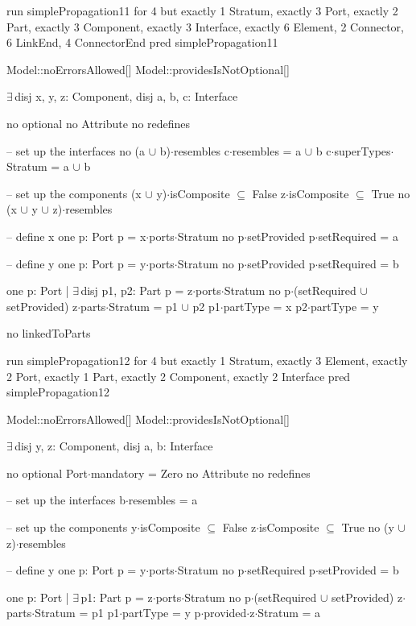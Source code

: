 run simplePropagation11 for 4 but exactly 1 Stratum, exactly 3 Port, exactly 2 Part, exactly 3 Component, exactly 3 Interface, exactly 6 Element, 2 Connector, 6 LinkEnd, 4 ConnectorEnd
pred simplePropagation11
{
  Model::noErrorsAllowed[]
  Model::providesIsNotOptional[]

  $\exists\,$disj x, y, z: Component,
       disj a, b, c: Interface
  {
    no optional
    no Attribute
    no redefines
  
    -- set up the interfaces
    no (a $\cup$ b)$\cdot$resembles
    c$\cdot$resembles = a $\cup$ b
    c$\cdot$superTypes$\cdot$Stratum = a $\cup$ b
    
  
    -- set up the components
    (x $\cup$ y)$\cdot$isComposite $\subseteq$ False
    z$\cdot$isComposite $\subseteq$ True
    no (x $\cup$ y $\cup$ z)$\cdot$resembles
    
    -- define x
    one p: Port
    {
      p = x$\cdot$ports$\cdot$Stratum
      no p$\cdot$setProvided
      p$\cdot$setRequired = a
    }
    
    -- define y
    one p: Port
    {
      p = y$\cdot$ports$\cdot$Stratum
      no p$\cdot$setProvided
      p$\cdot$setRequired = b
    }
    
    one p: Port | $\exists\,$disj p1, p2: Part
    {
      p = z$\cdot$ports$\cdot$Stratum
      no p$\cdot$(setRequired $\cup$ setProvided)
      z$\cdot$parts$\cdot$Stratum = p1 $\cup$ p2
      p1$\cdot$partType = x
      p2$\cdot$partType = y
    }
    
    no linkedToParts
  }
}


run simplePropagation12 for 4 but exactly 1 Stratum, exactly 3 Element, exactly 2 Port, exactly 1 Part, exactly 2 Component, exactly 2 Interface
pred simplePropagation12
{
  Model::noErrorsAllowed[]
  Model::providesIsNotOptional[]

  $\exists\,$disj y, z: Component,
       disj a, b: Interface
  {
    no optional
    Port$\cdot$mandatory = Zero
    no Attribute
    no redefines
  
    -- set up the interfaces
    b$\cdot$resembles = a
  
    -- set up the components
    y$\cdot$isComposite $\subseteq$ False
    z$\cdot$isComposite $\subseteq$ True
    no (y $\cup$ z)$\cdot$resembles
    
    -- define y
    one p: Port
    {
      p = y$\cdot$ports$\cdot$Stratum
      no p$\cdot$setRequired
      p$\cdot$setProvided = b
    }
    
    one p: Port | $\exists\,$p1: Part
    {
      p = z$\cdot$ports$\cdot$Stratum
      no p$\cdot$(setRequired $\cup$ setProvided)
      z$\cdot$parts$\cdot$Stratum = p1
      p1$\cdot$partType = y
      p$\cdot$provided$\cdot$z$\cdot$Stratum = a
    }
  }
}

